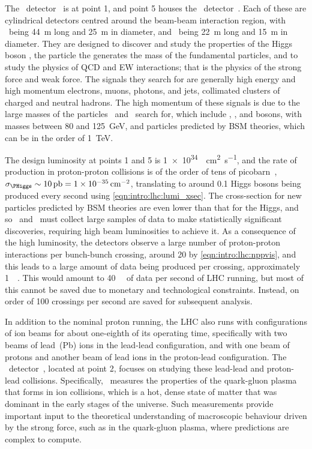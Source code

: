 The \atlas\ detector~\cite{Aad:2008zzm} is at point 1, and point 5 houses the 
\cms\ detector~\cite{Chatrchyan:2008aa}.
Each of these are cylindrical detectors centred around the beam-beam 
interaction region, with \atlas\ being \SI{44}{\metre} long and \SI{25}{\metre} 
in diameter, and \cms\ being \SI{22}{\metre} long and \SI{15}{\metre} in 
diameter.
They are designed to discover and study the properties of the Higgs boson 
\PHiggs, the particle the generates the mass of the fundamental particles, and 
to study the physics of \ac{QCD} and \ac{EW} interactions; that is the physics 
of the strong force and weak force.
The signals they search for are generally high energy and high momentum 
electrons, muons, photons, and jets, collimated clusters of charged and neutral 
hadrons.
The high momentum of these signals is due to the large masses of the particles 
\atlas\ and \cms\ search for, which include \PW, \PZ, and \PHiggs bosons, with 
masses between 80 and \SI{125}{\GeV}, and particles predicted by \ac{BSM} 
theories, which can be in the order of \SI{1}{\TeV}.

The design luminosity at points 1 and 5 is 
\SI{1e34}{\per\square\centi\metre\per\second}, and the rate of \PHiggs 
production in proton-proton collisions is of the order of tens of 
picobarn~\cite{Khachatryan:2016vau}, $\xsec_{\PHiggs} \sim \SI{10}{\pico\barn} 
= \SI{1e-35}{\per\square\centi\metre}$, translating to around 0.1 Higgs bosons 
being produced every second using \cref{eqn:intro:lhc:lumi_xsec}.
The cross-section for new particles predicted by \ac{BSM} theories are even 
lower than that for the Higgs, and so \atlas\ and \cms\ must collect large 
samples of data to make statistically significant discoveries, requiring high 
beam luminosities to achieve it.
As a consequence of the high luminosity, the detectors observe a large number 
of proton-proton interactions per bunch-bunch crossing, around 20 by 
\cref{eqn:intro:lhc:nppvis}, and this leads to a large amount of data being 
produced per crossing, approximately \SI{1}{\mega\byte}.
This would amount to \SI{40}{\tera\byte} of data per second of \ac{LHC} 
running, but most of this cannot be saved due to monetary and technological 
constraints.
Instead, on order of 100 crossings per second are saved for subsequent 
analysis.

In addition to the nominal proton running, the \ac{LHC} also runs with 
configurations of ion beams for about one-eighth of its operating time, 
specifically with two beams of lead~(Pb) ions in the lead-lead configuration, 
and with one beam of protons and another beam of lead ions in the proton-lead 
configuration.
The \alice\ detector~\cite{Aamodt:2008zz}, located at point 2, focuses on 
studying these lead-lead and proton-lead collisions.
Specifically, \alice\ measures the properties of the quark-gluon plasma that 
forms in ion collisions, which is a hot, dense state of matter that was 
dominant in the early stages of the universe.
Such measurements provide important input to the theoretical understanding of 
macroscopic behaviour driven by the strong force, such as in the quark-gluon 
plasma, where predictions are complex to compute.

